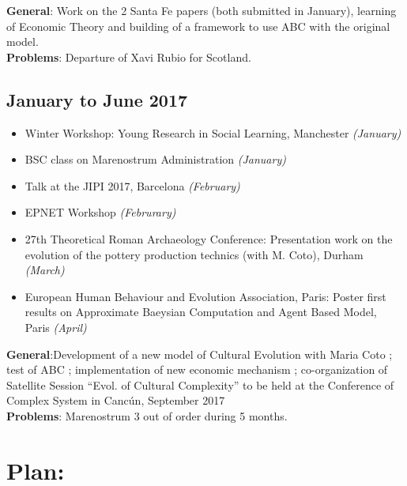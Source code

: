 \documentclass[a4paper]{article}
\begin{document}
	{\small
	\noindent \textbf{General}: Work on the 2 Santa Fe papers (both submitted in January), learning of Economic Theory and building of a framework to use ABC with the original model. \\
	    \textbf{Problems}: Departure of Xavi Rubio for Scotland.
	}

\subsection*{January to June 2017}
	\begin{itemize}
	    \item Winter Workshop: Young Research in Social Learning, Manchester \emph{(January)}
	    \item BSC class on Marenostrum Administration \emph{(January)}
	    \item Talk at the JIPI 2017, Barcelona \emph{(February)}
	    \item EPNET Workshop \emph{(Februrary)}
	    \item 27th Theoretical Roman Archaeology Conference:  Presentation work on the evolution of the pottery production technics (with M. Coto), Durham \emph{(March)}
	    \item  European Human Behaviour and Evolution Association, Paris: Poster first results on Approximate Baeysian Computation and Agent Based Model, Paris \emph{(April)}
	\end{itemize}
	{\small
	\noindent   \textbf{General}:Development of a new model of Cultural Evolution with Maria Coto ; test of ABC ; implementation of new economic mechanism ; co-organization of Satellite Session ``Evol. of Cultural Complexity'' to be held at the Conference of Complex System in Cancún, September 2017\\
	    \textbf{Problems}: Marenostrum 3 out of order during 5 months.
	}

	\section*{Plan:}
\end{document}
